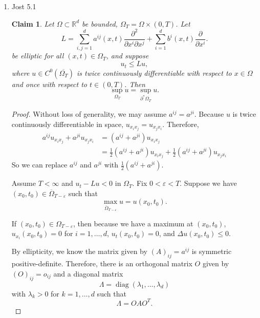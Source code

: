 \documentclass[a4paper]{article}
\newtheorem*{claim}{Claim}
\newcommand{\R}{\mathbb{R}}
\begin{document}
\begin{enumerate}
\begin{proof}
      Therefore, we have
      \[ \mu \int_{\partial M(y,T;\mu)}^{} u(x,t) \frac{|x-y|}{2(T-t)} = \mu \int_{\partial M(y,T;\mu)}^{} \left( \frac{d}{2(T-t)} + \frac{|x-y|^2}{4(T-t)^2} \right)
      u(x,t) .\]

      From here, I cannot get the right hand side to be $u(y,T)$.
    \end{proof}

  \item Jost 5.1
    \begin{claim}
      Let $\Omega \subset \R^d$ be bounded, $\Omega_T = \Omega \times (0,T)$. Let
      \[ L = \sum_{i,j=1}^d a^{ij}(x,t) \frac{\partial^2}{\partial x^i \partial x^j} + \sum_{i=1}^d b^i(x,t) \frac{\partial}{\partial x^i} .\]
      be elliptic for all $(x,t) \in \Omega_T$, and suppose
      \[ u_t \leq Lu, \]
      where $u \in C^0(\overline{\Omega_T})$ is twice continuously differentiable with respect to $x \in \Omega$ and once with respect to $t \in
      (0,T)$. Then
      \[ \sup_{\Omega_T} u = \sup_{\partial^\ast \Omega_T} u. \]
    \end{claim}

    \begin{proof}
      Without loss of generality, we may assume $a^{ij} = a^{ji}$. Because $u$ is twice continuously differentiable in space, $u_{x_i x_j} = u_{x_j
      x_i}$. Therefore,
      \begin{align*}
        a^{ij} u_{x_i x_j} + a^{ji} u_{x_j x_i} &= (a^{ij} + a^{ji}) u_{x_i x_j} \\
        &= \frac{1}{2} (a^{ij} + a^{ji}) u_{x_i x_j} + \frac{1}{2} (a^{ij} + a^{ji}) u_{x_j x_i}
      \end{align*}
      So we can replace $a^{ij}$ and $a^{ji}$ with $\frac{1}{2} (a^{ij} + a^{ji})$.

      Assume $T < \infty$ and $u_t - Lu < 0$ in $\Omega_T$.
      Fix $0<\varepsilon<T$. Suppose we have $(x_0,t_0) \in \overline{\Omega}_{T-\varepsilon}$ such that
      \[ \max_{\overline{\Omega}_{T-\varepsilon}} u = u(x_0,t_0) .\]

      If $(x_0, t_0) \in \Omega_{T-\varepsilon}$, then because we have a maximum at $(x_0, t_0)$, $u_{x_i}(x_0,t_0) = 0$ for $i = 1, \dots, d$, $u_t(x_0,t_0) = 0$, and $\Delta u(x_0,t_0) \leq 0$.

      By ellipticity, we know the matrix given by $(A)_{ij} = a^{ij}$ is symmetric positive-definite. Therefore, there is an orthogonal matrix $O$
      given by $(O)_{ij} = o_{ij}$ and
      a diagonal matrix
      \[ \Lambda = \mathop{diag} (\lambda_1, \dots, \lambda_d) \]
      with $\lambda_k > 0$ for $k = 1, \dots, d$ such that
      \[ \Lambda = O A O^T .\]


\end{proof}
\end{enumerate}
\end{document}
